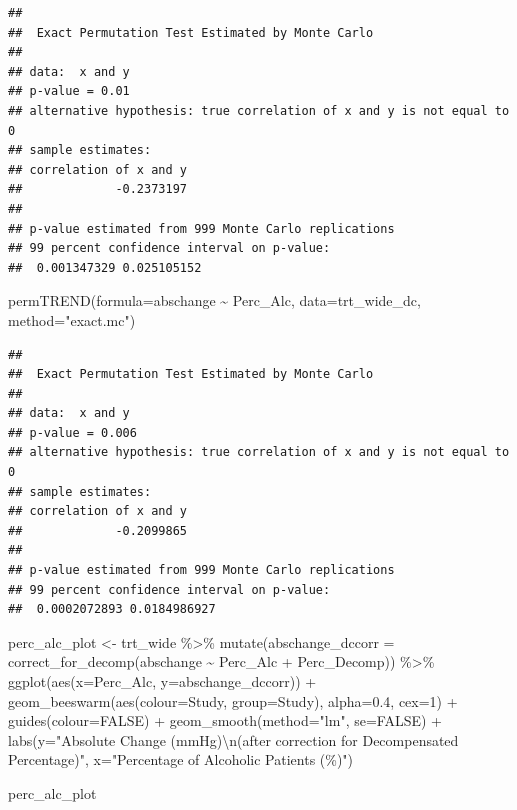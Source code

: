 \documentclass[
]{article}
\newenvironment{Shaded}{\begin{snugshade}}{\end{snugshade}}
\newcommand{\AttributeTok}[1]{\textcolor[rgb]{0.77,0.63,0.00}{#1}}
\newcommand{\ConstantTok}[1]{\textcolor[rgb]{0.00,0.00,0.00}{#1}}
\newcommand{\DecValTok}[1]{\textcolor[rgb]{0.00,0.00,0.81}{#1}}
\newcommand{\FloatTok}[1]{\textcolor[rgb]{0.00,0.00,0.81}{#1}}
\newcommand{\FunctionTok}[1]{\textcolor[rgb]{0.00,0.00,0.00}{#1}}
\newcommand{\NormalTok}[1]{#1}
\newcommand{\OtherTok}[1]{\textcolor[rgb]{0.56,0.35,0.01}{#1}}
\newcommand{\SpecialCharTok}[1]{\textcolor[rgb]{0.00,0.00,0.00}{#1}}
\newcommand{\StringTok}[1]{\textcolor[rgb]{0.31,0.60,0.02}{#1}}
\begin{document}
\begin{verbatim}
## 
##  Exact Permutation Test Estimated by Monte Carlo
## 
## data:  x and y
## p-value = 0.01
## alternative hypothesis: true correlation of x and y is not equal to 0
## sample estimates:
## correlation of x and y 
##             -0.2373197 
## 
## p-value estimated from 999 Monte Carlo replications
## 99 percent confidence interval on p-value:
##  0.001347329 0.025105152
\end{verbatim}

\begin{Shaded}
\begin{Highlighting}[]
\FunctionTok{permTREND}\NormalTok{(}\AttributeTok{formula=}\NormalTok{abschange }\SpecialCharTok{\textasciitilde{}}\NormalTok{ Perc\_Alc, }\AttributeTok{data=}\NormalTok{trt\_wide\_dc,}
          \AttributeTok{method=}\StringTok{"exact.mc"}\NormalTok{)}
\end{Highlighting}
\end{Shaded}

\begin{verbatim}
## 
##  Exact Permutation Test Estimated by Monte Carlo
## 
## data:  x and y
## p-value = 0.006
## alternative hypothesis: true correlation of x and y is not equal to 0
## sample estimates:
## correlation of x and y 
##             -0.2099865 
## 
## p-value estimated from 999 Monte Carlo replications
## 99 percent confidence interval on p-value:
##  0.0002072893 0.0184986927
\end{verbatim}

\begin{Shaded}
\begin{Highlighting}[]
\NormalTok{perc\_alc\_plot }\OtherTok{\textless{}{-}}\NormalTok{ trt\_wide }\SpecialCharTok{\%\textgreater{}\%} 
  \FunctionTok{mutate}\NormalTok{(}\AttributeTok{abschange\_dccorr =} \FunctionTok{correct\_for\_decomp}\NormalTok{(abschange }\SpecialCharTok{\textasciitilde{}}\NormalTok{ Perc\_Alc }\SpecialCharTok{+}\NormalTok{ Perc\_Decomp)) }\SpecialCharTok{\%\textgreater{}\%} 
  \FunctionTok{ggplot}\NormalTok{(}\FunctionTok{aes}\NormalTok{(}\AttributeTok{x=}\NormalTok{Perc\_Alc, }\AttributeTok{y=}\NormalTok{abschange\_dccorr)) }\SpecialCharTok{+}
  \FunctionTok{geom\_beeswarm}\NormalTok{(}\FunctionTok{aes}\NormalTok{(}\AttributeTok{colour=}\NormalTok{Study, }\AttributeTok{group=}\NormalTok{Study), }\AttributeTok{alpha=}\FloatTok{0.4}\NormalTok{, }\AttributeTok{cex=}\DecValTok{1}\NormalTok{) }\SpecialCharTok{+}
  \FunctionTok{guides}\NormalTok{(}\AttributeTok{colour=}\ConstantTok{FALSE}\NormalTok{) }\SpecialCharTok{+} 
  \FunctionTok{geom\_smooth}\NormalTok{(}\AttributeTok{method=}\StringTok{"lm"}\NormalTok{, }\AttributeTok{se=}\ConstantTok{FALSE}\NormalTok{) }\SpecialCharTok{+}
  \FunctionTok{labs}\NormalTok{(}\AttributeTok{y=}\StringTok{"Absolute Change (mmHg)}\SpecialCharTok{\textbackslash{}n}\StringTok{(after correction for Decompensated Percentage)"}\NormalTok{,}
       \AttributeTok{x=}\StringTok{"Percentage of Alcoholic Patients (\%)"}\NormalTok{)}

\NormalTok{perc\_alc\_plot}
\end{Highlighting}
\end{Shaded}
\end{document}
